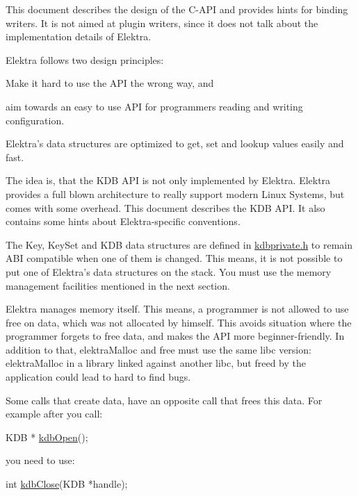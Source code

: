 This document describes the design of the C-\/\+A\+PI and provides hints for binding writers. It is not aimed at plugin writers, since it does not talk about the implementation details of Elektra.

Elektra follows two design principles\+:


\begin{DoxyEnumerate}
\item Make it hard to use the A\+PI the wrong way, and
\item aim towards an easy to use A\+PI for programmers reading and writing configuration.
\end{DoxyEnumerate}

Elektra’s data structures are optimized to get, set and lookup values easily and fast.

The idea is, that the K\+DB A\+PI is not only implemented by Elektra. Elektra provides a full blown architecture to really support modern Linux Systems, but comes with some overhead. This document describes the {\ttfamily K\+DB} A\+PI. It also contains some hints about Elektra-\/specific conventions.

The {\ttfamily Key}, {\ttfamily Key\+Set} and {\ttfamily K\+DB} data structures are defined in {\ttfamily \hyperlink{kdbprivate_8h}{kdbprivate.\+h}} to remain A\+BI compatible when one of them is changed. This means, it is not possible to put one of Elektra’s data structures on the stack. You must use the memory management facilities mentioned in the next section.

Elektra manages memory itself. This means, a programmer is not allowed to use free on data, which was not allocated by himself. This avoids situation where the programmer forgets to free data, and makes the A\+PI more beginner-\/friendly. In addition to that, {\ttfamily elektra\+Malloc} and {\ttfamily free} must use the same libc version\+: {\ttfamily elektra\+Malloc} in a library linked against another libc, but freed by the application could lead to hard to find bugs.

Some calls that create data, have an opposite call that frees this data. For example after you call\+:


\begin{DoxyCode}
KDB * \hyperlink{group__kdb_ga6808defe5870f328dd17910aacbdc6ca}{kdbOpen}();
\end{DoxyCode}


you need to use\+:


\begin{DoxyCode}
\textcolor{keywordtype}{int} \hyperlink{group__kdb_gadb54dc9fda17ee07deb9444df745c96f}{kdbClose}(KDB *handle);
\end{DoxyCode}


